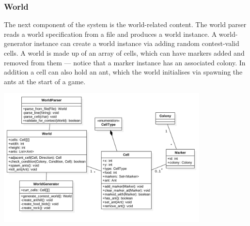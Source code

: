 \documentclass[11pt]{article}
\begin{document}
\subsubsection{World}

The next component of the system is the world-related content. The world parser reads a world specification from a file and produces a world instance. A world-generator instance can create a world instance via adding random contest-valid cells. A world is made up of an array of cells, which can have markers added and removed from them --- notice that a marker instance has an associated colony. In addition a cell can also hold an ant, which the world initialises via spawning the ants at the start of a game. 

\begin{center}
\includegraphics[width=0.8\textwidth]{low-level-diagrams/class/world.png}
\end{center}
\end{document}
